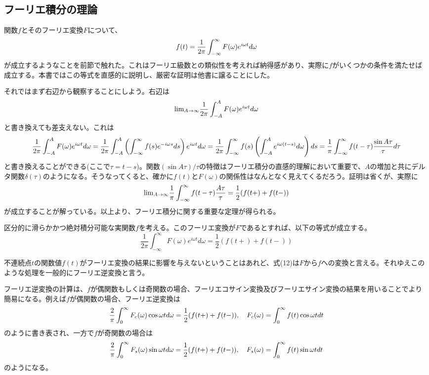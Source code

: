 \documentclass[dvipdfmx, 9pt, a4paper]{jsarticle}
\begin{document}
\subsection{フーリエ積分の理論}
関数$f$とそのフーリエ変換$F$について、
\begin{equation}
f(t)=\frac{1}{2\pi}\int_{-\infty}^\infty F(\omega)e^{i\omega t}d\omega \notag
\end{equation}
が成立するようなことを前節で触れた。これはフーリエ級数との類似性を考えれば納得感があり、実際に$f$がいくつかの条件を満たせば成立する。本書ではこの等式を直感的に説明し、厳密な証明は他書に譲ることにした。\par
それではまず右辺から観察することにしよう。右辺は
\begin{equation}
{\rm lim}_{A \to \infty}\frac{1}{2\pi}\int_{-A}^A F(\omega)e^{i\omega t}d\omega \notag
\end{equation}
と書き換えても差支えない。これは
\begin{equation}
\frac{1}{2\pi}\int_{-A}^A F(\omega)e^{i\omega t}d\omega=\frac{1}{2\pi}\int_{-A}^A \left(\int_{-\infty}^{\infty} f(s)e^{-i\omega s}ds \right)e^{i\omega t}d\omega=\frac{1}{2\pi}\int_{-\infty}^\infty f(s) \left(\int_{-A}^A e^{i\omega (t-s)}d\omega \right)ds = \frac{1}{\pi}\int_{-\infty}^\infty f(t-\tau)\frac{\sin A\tau}{\tau}d\tau \notag
\end{equation}
と書き換えることができる(ここで$\tau=t-s$)。関数$(\sin A\tau)/\tau$の特徴はフーリエ積分の直感的理解において重要で、$A$の増加と共にデルタ関数$\delta(\tau)$のようになる。そうなってくると、確かに$f(t)$と$F(\omega)$の関係性はなんとなく見えてくるだろう。証明は省くが、実際に
\begin{equation}
{\rm lim}_{A \to \infty}\frac{1}{\pi}\int_{-\infty}^\infty f(t-\tau)\frac{A\tau}{\tau}=\frac{1}{2}(f(t+)+f(t-)) \notag
\end{equation}
が成立することが解っている。以上より、フーリエ積分に関する重要な定理が得られる。
\begin{tcolorbox}[title=フーリエ積分]
区分的に滑らかかつ絶対積分可能な実関数$f$を考える。このフーリエ変換が$F$であるとすれば、以下の等式が成立する。
\begin{equation}
\frac{1}{2\pi}\int_{-\infty}^\infty F(\omega)e^{i\omega t}d\omega =\frac{1}{2}(f(t+)+f(t-))
\end{equation}
\end{tcolorbox}
不連続点$t$の関数値$f(t)$がフーリエ変換の結果に影響を与えないということはあれど、式(12)は$F$から$f$への変換と言える。それゆえこのような処理を一般的にフーリエ逆変換と言う。\par
フーリエ逆変換の計算は、$f$が偶関数もしくは奇関数の場合、フーリエコサイン変換及びフーリエサイン変換の結果を用いることでより簡易になる。例えば$f$が偶関数の場合、フーリエ逆変換は
\begin{equation}
\frac{2}{\pi}\int_0^\infty F_c(\omega)\cos \omega td\omega = \frac{1}{2}(f(t+)+f(t-)),~~~F_c(\omega)=\int_0^\infty f(t)\cos \omega tdt \notag
\end{equation}
のように書き表され、一方で$f$が奇関数の場合は
\begin{equation}
\frac{2}{\pi}\int_0^\infty F_s(\omega)\sin \omega td\omega = \frac{1}{2}(f(t+)+f(t-)),~~~F_s(\omega)=\int_0^\infty f(t)\sin \omega tdt \notag
\end{equation}
のようになる。
\end{document}

